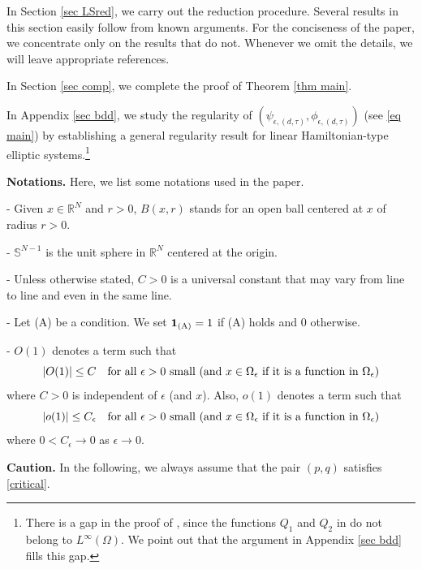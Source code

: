 \documentclass[reqno]{amsart}
\theoremstyle{remark}
\newcommand{\ep}{\epsilon}
\newcommand{\R}{\mathbb{R}}
\newcommand{\mone}{\mathbf{1}}
\renewcommand{\(}{\left(}
\renewcommand{\)}{\right)}
\numberwithin{equation}{section}
\begin{document}
In Section \ref{sec LSred}, we carry out the reduction procedure.
Several results in this section easily follow from known arguments. For the conciseness of the paper, we concentrate only on the results that do not. Whenever we omit the details, we will leave appropriate references.

In Section \ref{sec comp}, we complete the proof of Theorem \ref{thm main}.

In Appendix \ref{sec bdd}, we study the regularity of $(\psi_{\ep,(d,\tau)},\phi_{\ep,(d,\tau)})$ (see \eqref{eq main}) by establishing a general regularity result
for linear Hamiltonian-type elliptic systems.\footnote{There is a gap in the proof of \cite[Proposition 4.6]{KP},
since the functions $Q_1$ and $Q_2$ in \cite[(B.5)]{KP} do not belong to $L^{\infty}(\Omega)$. We point out that the argument in Appendix \ref{sec bdd} fills this gap.}

\medskip \noindent \textbf{Notations.}
Here, we list some notations used in the paper.

\medskip \noindent - Given $x \in \R^N$ and $r > 0$, $B(x,r)$ stands for an open ball centered at $x$ of radius $r > 0$.

\medskip \noindent - $\mathbb{S}^{N-1}$ is the unit sphere in $\R^N$ centered at the origin.

\medskip \noindent - Unless otherwise stated, $C > 0$ is a universal constant that may vary from line to line and even in the same line.

\medskip \noindent - Let (A) be a condition. We set $\mone_{\textup{(A)}} = 1$ if (A) holds and $0$ otherwise.

\medskip \noindent - $O(1)$ denotes a term such that
\begin{equation}\label{O(1)}
|O(1)| \le C \quad \textup{for all } \ep > 0 \textup{ small } (\textup{and } x \in \Omega_\ep \textup{ if it is a function in } \Omega_\ep)
\end{equation}
where $C > 0$ is independent of $\ep$ (and $x$). Also, $o(1)$ denotes a term such that
\begin{equation}\label{o(1)}
|o(1)| \le C_{\ep} \quad \textup{for all } \ep > 0 \textup{ small } (\textup{and } x \in \Omega_\ep \textup{ if it is a function in } \Omega_\ep)
\end{equation}
where $0 < C_{\ep} \to 0$ as $\ep \to 0$.

\medskip \noindent \textbf{Caution.} In the following, we always assume that the pair $(p,q)$ satisfies \eqref{critical}.
\end{document}
